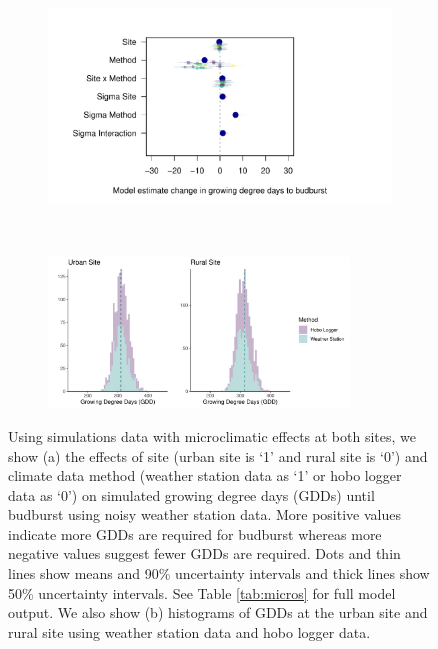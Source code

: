 \documentclass{article}\usepackage[]{graphicx}\usepackage[]{color}
\begin{document}
\begin{figure}[H]
  \begin{subfigure}{.5\linewidth}
    \caption{}
      \centering
      \includegraphics[height=7cm, width=11cm]{..//analyses/figures/muplot_micros.pdf}
      \label{fig:muplotmicros}
  \end{subfigure}%
    \begin{subfigure}{.5\linewidth}
      \caption{}
      \centering
      \includegraphics[height=4cm, width=8cm]{..//analyses/figures/gdd_sites_micros.pdf}
    \label{fig:gddmicros}
  \end{subfigure}
\caption{ Using simulations data with microclimatic effects at both sites, we show (a) the effects of site (urban site is `1' and rural site is `0') and climate data method (weather station data as `1' or hobo logger data as `0') on simulated growing degree days (GDDs) until budburst using noisy weather station data. More positive values indicate more GDDs are required for budburst whereas more negative values suggest fewer GDDs are required. Dots and thin lines show means and 90\% uncertainty intervals and thick lines show 50\% uncertainty intervals. See Table \ref{tab:micros} for full model output. We also show (b) histograms of GDDs at the urban site and rural site using weather station data and hobo logger data. }
\label{fig:micros}
\end{figure}
\end{document}
